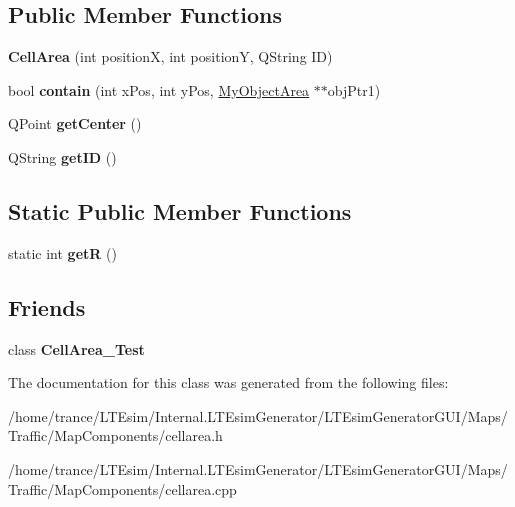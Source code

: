 \subsection*{Public Member Functions}
\begin{DoxyCompactItemize}
\item 
{\bfseries Cell\+Area} (int positionX, int positionY, Q\+String ID)\hypertarget{class_cell_area_a15484a68caf1bbca21b0c5bf90376c7a}{}\label{class_cell_area_a15484a68caf1bbca21b0c5bf90376c7a}

\item 
bool {\bfseries contain} (int x\+Pos, int y\+Pos, \hyperlink{class_my_object_area}{My\+Object\+Area} $\ast$$\ast$obj\+Ptr1)\hypertarget{class_cell_area_a86f80474e184602d64923eefc39d09a9}{}\label{class_cell_area_a86f80474e184602d64923eefc39d09a9}

\item 
Q\+Point {\bfseries get\+Center} ()\hypertarget{class_cell_area_abca39734a387fa7a9029ea96541a793a}{}\label{class_cell_area_abca39734a387fa7a9029ea96541a793a}

\item 
Q\+String {\bfseries get\+ID} ()\hypertarget{class_cell_area_a506290acadb951c4217cf6828d4eedb2}{}\label{class_cell_area_a506290acadb951c4217cf6828d4eedb2}

\end{DoxyCompactItemize}
\subsection*{Static Public Member Functions}
\begin{DoxyCompactItemize}
\item 
static int {\bfseries getR} ()\hypertarget{class_cell_area_aa28afcd07a265c9bb987d97df5cbe5fa}{}\label{class_cell_area_aa28afcd07a265c9bb987d97df5cbe5fa}

\end{DoxyCompactItemize}
\subsection*{Friends}
\begin{DoxyCompactItemize}
\item 
class {\bfseries Cell\+Area\+\_\+\+Test}\hypertarget{class_cell_area_aa20b890699cb6ef2056c0d229975cb17}{}\label{class_cell_area_aa20b890699cb6ef2056c0d229975cb17}

\end{DoxyCompactItemize}


The documentation for this class was generated from the following files\+:\begin{DoxyCompactItemize}
\item 
/home/trance/\+L\+T\+Esim/\+Internal.\+L\+T\+Esim\+Generator/\+L\+T\+Esim\+Generator\+G\+U\+I/\+Maps/\+Traffic/\+Map\+Components/cellarea.\+h\item 
/home/trance/\+L\+T\+Esim/\+Internal.\+L\+T\+Esim\+Generator/\+L\+T\+Esim\+Generator\+G\+U\+I/\+Maps/\+Traffic/\+Map\+Components/cellarea.\+cpp\end{DoxyCompactItemize}

